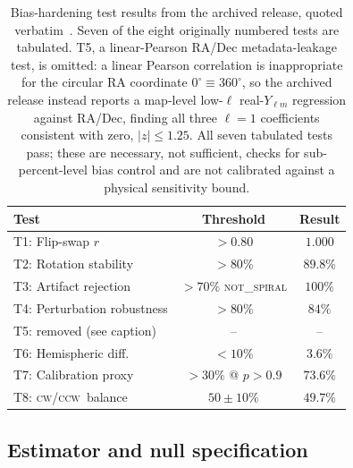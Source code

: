 \documentclass[twocolumn,linenumbers]{aastex702}
\newcommand{\CW}{\textsc{cw}}
\newcommand{\CCW}{\textsc{ccw}}
\newcommand{\NS}{\textsc{not\_spiral}}
\begin{document}
\begin{table}[t]
\caption{Bias-hardening test results from the archived release, quoted
verbatim~\cite{Golden:P4v274}. Seven of the eight originally numbered tests
are tabulated. T5, a linear-Pearson RA/Dec metadata-leakage test, is
omitted: a linear Pearson correlation is inappropriate for the circular RA
coordinate $0^\circ\equiv360^\circ$, so the archived release instead reports
a map-level low-$\ell$ real-$Y_{\ell m}$ regression against RA/Dec, finding
all three $\ell=1$ coefficients consistent with zero, $|z|\leq1.25$. All
seven tabulated tests pass; these are
necessary, not sufficient, checks for sub-percent-level bias control and
are not calibrated against a physical sensitivity bound.
\label{tab:bias_tests}}
\footnotesize
\begin{tabular}{lcc}
\toprule
Test & Threshold & Result \\
\midrule
T1: Flip-swap $r$ & $>0.80$ & $1.000$ \\
T2: Rotation stability & $>80\%$ & $89.8\%$ \\
T3: Artifact rejection & $>70\%$ \NS & $100\%$ \\
T4: Perturbation robustness & $>80\%$ & $84\%$ \\
T5: removed (see caption) & -- & -- \\
T6: Hemispheric diff. & $<10\%$ & $3.6\%$ \\
T7: Calibration proxy & $>30\%$ @ $p{>}0.9$ & $73.6\%$ \\
T8: \CW/\CCW\ balance & $50\pm10\%$ & $49.7\%$ \\
\bottomrule
\end{tabular}
\end{table}

\subsection{Estimator and null specification}
\label{sec:estimator_spec}
\end{document}
